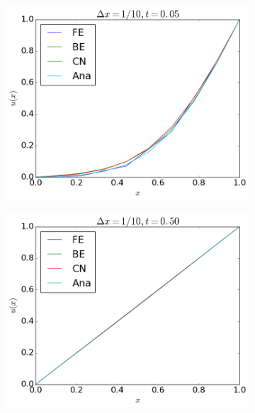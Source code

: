 \documentclass[12pt, a4paper]{article}
\begin{document}
\begin{figure}[ht!]
	\centering 
  	\begin{subfigure}[b]{0.495\textwidth}
		\includegraphics[width=\textwidth]{../Programs/Output/Diffusion_1d_9_t1.png}
  	\end{subfigure}
  	\begin{subfigure}[b]{0.495\textwidth}
		\includegraphics[width=\textwidth]{../Programs/Output/Diffusion_1d_9_t2.png}
  	\end{subfigure}
  	\begin{subfigure}[b]{0.495\textwidth}

\end{subfigure}
\end{figure}
\end{document}
